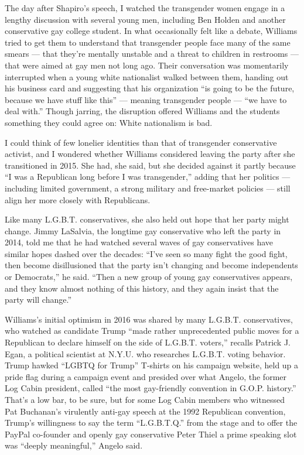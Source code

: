 The day after Shapiro's speech, I watched the transgender women engage
in a lengthy discussion with several young men, including Ben Holden and
another conservative gay college student. In what occasionally felt like
a debate, Williams tried to get them to understand that transgender
people face many of the same smears --- that they're mentally unstable
and a threat to children in restrooms --- that were aimed at gay men not
long ago. Their conversation was momentarily interrupted when a young
white nationalist walked between them, handing out his business card and
suggesting that his organization ``is going to be the future, because we
have stuff like this'' --- meaning transgender people --- ``we have to
deal with.'' Though jarring, the disruption offered Williams and the
students something they could agree on: White nationalism is bad.

I could think of few lonelier identities than that of transgender
conservative activist, and I wondered whether Williams considered
leaving the party after she transitioned in 2015. She had, she said, but
she decided against it partly because ``I was a Republican long before I
was transgender,'' adding that her politics --- including limited
government, a strong military and free-market policies --- still align
her more closely with Republicans.

Like many L.G.B.T. conservatives, she also held out hope that her party
might change. Jimmy LaSalvia, the longtime gay conservative who left the
party in 2014, told me that he had watched several waves of gay
conservatives have similar hopes dashed over the decades: ``I've seen so
many fight the good fight, then become disillusioned that the party
isn't changing and become independents or Democrats,'' he said. ``Then a
new group of young gay conservatives appears, and they know almost
nothing of this history, and they again insist that the party will
change.''

Williams's initial optimism in 2016 was shared by many L.G.B.T.
conservatives, who watched as candidate Trump ``made rather
unprecedented public moves for a Republican to declare himself on the
side of L.G.B.T. voters,'' recalls Patrick J. Egan, a political
scientist at N.Y.U. who researches L.G.B.T. voting behavior. Trump
hawked ``LGBTQ for Trump'' T-shirts on his campaign website, held up a
pride flag during a campaign event and presided over what Angelo, the
former Log Cabin president, called ``the most gay-friendly convention in
G.O.P. history.'' That's a low bar, to be sure, but for some Log Cabin
members who witnessed Pat Buchanan's virulently anti-gay speech at the
1992 Republican convention, Trump's willingness to say the term
``L.G.B.T.Q.'' from the stage and to offer the PayPal co-founder and
openly gay conservative Peter Thiel a prime speaking slot was ``deeply
meaningful,'' Angelo said.

